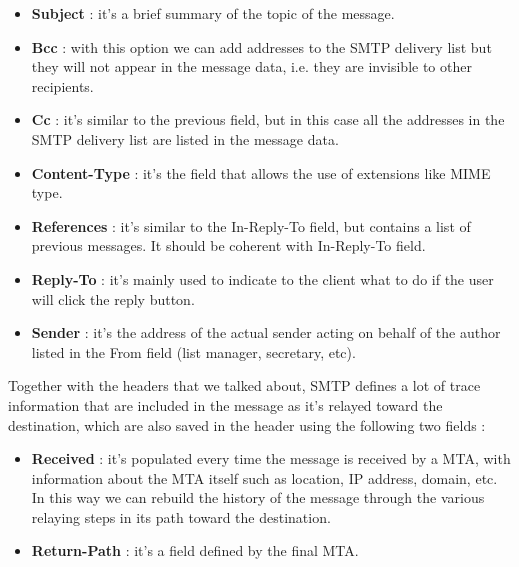 \begin{itemize}
\item \textbf{Subject} : it's a brief summary of the topic of the message.
\item \textbf{Bcc} : with this option we can add addresses to the SMTP delivery list but they will not appear in the message data, i.e. they are invisible to other recipients.
\item \textbf{Cc} : it's similar to the previous field, but in this case all the addresses in the SMTP delivery list are listed in the message data. 
\item \textbf{Content-Type} : it's the field that allows the use of extensions like MIME type.
\item \textbf{References} : it's similar to the In-Reply-To field, but contains a list of previous messages. It should be coherent with In-Reply-To field.
\item \textbf{Reply-To} : it's mainly used to indicate to the client what to do if the user will click the reply button.
\item \textbf{Sender} : it's the address of the actual sender acting on behalf of the author listed in the From field (list manager, secretary, etc).
\end{itemize}
Together with the headers that we talked about, SMTP defines a lot of trace information that are included in the message as it's relayed toward the destination, which are also saved in the header using the following two fields :
\begin{itemize}
\item \textbf{Received} : it's populated every time the message is received by a MTA, with information about the MTA itself such as location, IP address, domain, etc. In this way we can rebuild the history of the message through the various relaying steps in its path toward the destination.
\item \textbf{Return-Path} : it's a field defined by the final MTA.
\end{itemize}
